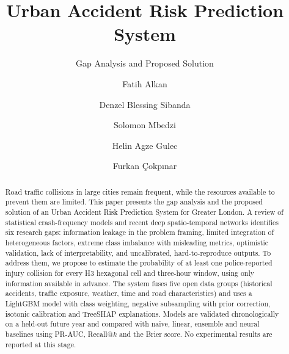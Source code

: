 \documentclass[sigconf,nonacm]{acmart}
\begin{document}
\title{Urban Accident Risk Prediction System}
\subtitle{Gap Analysis and Proposed Solution}

\author{Fatih Alkan}

\author{Denzel Blessing Sibanda}

\author{Solomon Mbedzi}

\author{Helin Agze Gulec}

\author{Furkan \c{C}okp{\i}nar}

\renewcommand{\shortauthors}{Alkan et al.}

\begin{abstract}
Road traffic collisions in large cities remain frequent, while the resources available to
prevent them are limited. This paper presents the gap analysis and the proposed solution of an
Urban Accident Risk Prediction System for Greater London. A review of statistical crash-frequency
models and recent deep spatio-temporal networks identifies six research gaps: information leakage
in the problem framing, limited integration of heterogeneous factors, extreme class imbalance
with misleading metrics, optimistic validation, lack of interpretability, and uncalibrated,
hard-to-reproduce outputs. To address them, we propose to estimate the probability of at least
one police-reported injury collision for every H3 hexagonal cell and three-hour window, using
only information available in advance. The system fuses five open data groups (historical
accidents, traffic exposure, weather, time and road characteristics) and uses a LightGBM model
with class weighting, negative subsampling with prior correction, isotonic calibration and
TreeSHAP explanations. Models are validated chronologically on a held-out future year and
compared with naive, linear, ensemble and neural baselines using PR-AUC, Recall@$k$ and the Brier
score. No experimental results are reported at this stage.
\end{abstract}
\end{document}
